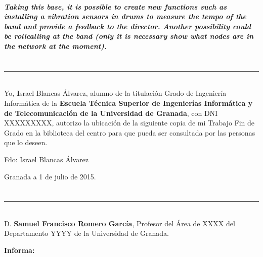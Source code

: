 \paragraph{
Taking this base, it is possible to create new functions such as installing a vibration sensors in drums to measure the tempo of the band and provide a feedback to the director. Another possibility could be rollcalling at the band (only it is necessary show what nodes are in the network at the moment).
}

\chapter*{}
\thispagestyle{empty}

\noindent\rule[-1ex]{\textwidth}{2pt}\\[4.5ex]

Yo, \textbf Israel Blancas Álvarez, alumno de la titulación Grado de Ingeniería Informática de la \textbf{Escuela Técnica Superior
de Ingenierías Informática y de Telecomunicación de la Universidad de Granada}, con DNI XXXXXXXXX, autorizo la
ubicación de la siguiente copia de mi Trabajo Fin de Grado en la biblioteca del centro para que pueda ser
consultada por las personas que lo deseen.

\vspace{6cm}

\noindent Fdo: Israel Blancas Álvarez

\vspace{2cm}

\begin{flushright}
Granada a 1 de julio de 2015.
\end{flushright}


\chapter*{}
\thispagestyle{empty}

\noindent\rule[-1ex]{\textwidth}{2pt}\\[4.5ex]

D. \textbf{Samuel Francisco Romero García}, Profesor del Área de XXXX del Departamento YYYY de la Universidad de Granada.

\vspace{0.5cm}


\vspace{0.5cm}

\textbf{Informa:}

\vspace{0.5cm}

